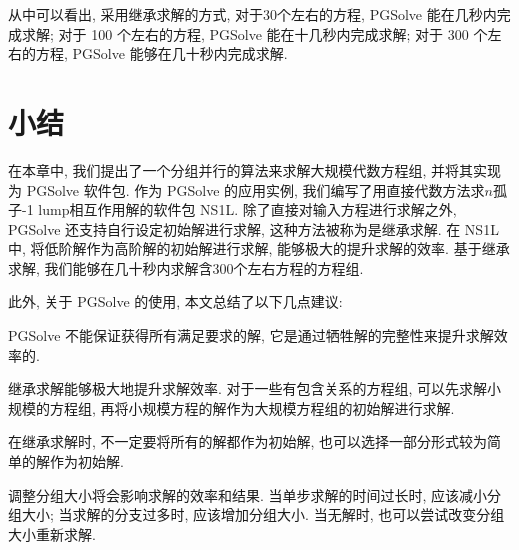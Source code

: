 从中可以看出, 采用继承求解的方式, 对于30个左右的方程, PGSolve 能在几秒内完成求解; 对于 100 个左右的方程, PGSolve 能在十几秒内完成求解; 对于 300 个左右的方程, PGSolve 能够在几十秒内完成求解. 
 

\section{小结}
在本章中, 我们提出了一个分组并行的算法来求解大规模代数方程组, 并将其实现为 PGSolve 软件包. 作为 PGSolve 的应用实例, 我们编写了用直接代数方法求$n$孤子-1 lump相互作用解的软件包 NS1L. 除了直接对输入方程进行求解之外, PGSolve 还支持自行设定初始解进行求解, 这种方法被称为是继承求解. 在 NS1L 中, 将低阶解作为高阶解的初始解进行求解, 能够极大的提升求解的效率. 基于继承求解, 我们能够在几十秒内求解含300个左右方程的方程组. 

此外, 关于 PGSolve 的使用, 本文总结了以下几点建议:
\begin{compactenum}[(1)]
\item PGSolve 不能保证获得所有满足要求的解, 它是通过牺牲解的完整性来提升求解效率的.
\item 继承求解能够极大地提升求解效率. 对于一些有包含关系的方程组, 可以先求解小规模的方程组, 再将小规模方程的解作为大规模方程组的初始解进行求解. 
\item 在继承求解时, 不一定要将所有的解都作为初始解, 也可以选择一部分形式较为简单的解作为初始解.
\item 调整分组大小将会影响求解的效率和结果. 当单步求解的时间过长时, 应该减小分组大小; 当求解的分支过多时, 应该增加分组大小. 当无解时, 也可以尝试改变分组大小重新求解. 
\end{compactenum}
 
